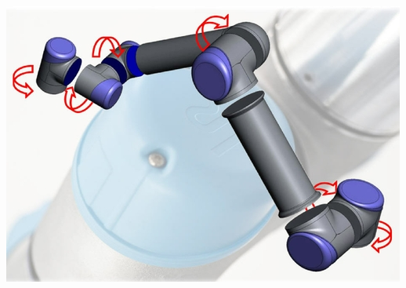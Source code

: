 \begin{minipage}{0.64\textwidth}	
		\includegraphics[width=\textwidth]{UR_joints}			
\end{minipage}
